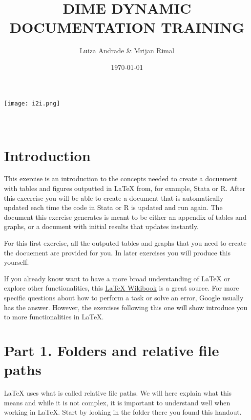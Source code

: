 \documentclass[12pts]{report}
\title{DIME DYNAMIC DOCUMENTATION TRAINING }
\author{Luiza Andrade \& Mrijan Rimal}
\date{\today}
\begin{document}
	

\makeatletter
\begin{titlepage}
	\begin{center}
		\texttt{[image: i2i.png]}\\[10ex]
		{\LARGE \bfseries  \@title }\\[2ex] 
		{\Large  \@author}\\[20ex] 
		{\large \@date}
	\end{center}
\end{titlepage}
\makeatother

\section*{Introduction}
This exercise is an introduction to the concepts needed to create a docuement with tables and figures outputted in {\LaTeX} from, for example, Stata or R. After this excercise you will be able to create a document that is automatically updated each time the code in Stata or R is updated and run again. The document this exercise generates is meant to be either an appendix of tables and graphs, or a document with initial results that updates instantly.

For this first exercise, all the outputed tables and graphs that you need to create the docuement are provided for you. In later exercises you will produce this yourself.

If you already know want to have a more broad understanding of {\LaTeX} or explore other functionalities, this \href{https://en.wikibooks.org/wiki/LaTeX
}{{\LaTeX} Wikibook} is a great source. For more specific questions about how to perform a task or solve an error, Google usually has the answer. However, the exercises following this one will show introduce you to more functionalities in {\LaTeX}.

\section*{Part 1. Folders and relative file paths}
{\LaTeX} uses what is called relative file paths. We will here explain what this means and while it is not complex, it is important to understand well when working in {\LaTeX}. Start by looking in the folder there you found this handout. 
\end{document}
